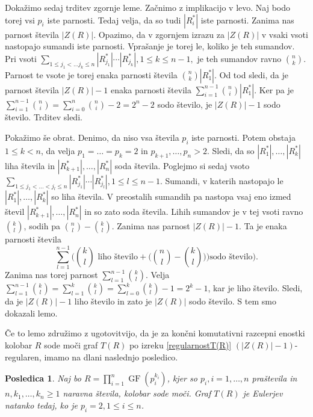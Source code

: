 \documentclass[a4paper, 12pt]{amsart}
\theoremstyle{definition} %
\theoremstyle{plain} %
\newtheorem{posledica}[definicija]{Posledica}
\DeclareMathOperator{\GF}{GF}
\begin{document}
Dokažimo sedaj trditev zgornje leme. Začnimo z implikacijo v levo. Naj bodo torej vsi $p_i$ iste parnosti. Tedaj velja, da so tudi $|R_i^*|$ iste parnosti. Zanima nas parnost števila $|Z(R)|$. Opazimo, da v zgornjem izrazu za $|Z(R)|$ v vsaki vsoti nastopajo sumandi iste parnosti. Vprašanje je torej le, koliko je teh sumandov. Pri vsoti $\sum_{1\le j_1 < \dots j_k \le n}|R_{j_1}^*| \cdots |R_{j_k}^*|, 1 \le k \le n-1,$ je teh sumandov ravno ${n \choose k}$. Parnost te vsote je torej enaka parnosti števila ${n \choose k} |R_1^*|$. Od tod sledi, da je parnost števila $|Z(R)| -1$ enaka parnosti števila $\sum_{i=1}^{n-1} {n \choose i} |R_1^*|$. Ker pa je $\sum_{i=1}^{n-1} {n \choose i} = \sum_{i=0}^{n} {n \choose i} - 2 = 2^n - 2 $ sodo število, je $|Z(R)| -1$ sodo število. Trditev sledi.

Pokažimo še obrat. Denimo, da niso vsa števila $p_i$ iste parnosti. Potem obstaja $1\le k <n$, da velja $p_1 = \dots=p_k =2$ in $p_{k+1},\dots,p_n >2$. Sledi, da so $|R_1^*|,\dots,|R_k^*|$ liha števila in $|R_{k+1}^*|, \dots, |R_n^*|$ soda števila.
Poglejmo si sedaj vsoto  $\sum_{1\le j_1 < \dots < j_l \le n}|R_{j_1}^*| \cdots |R_{j_l}^*|, 1 \le l \le n-1$. Sumandi, v katerih nastopajo le $|R_1^*|,\dots,|R_k^*|$ so liha števila. V preostalih sumandih pa nastopa vsaj eno izmed števil $|R_{k+1}^*|,\dots,|R_n^*|$ in so zato soda števila. Lihih sumandov je v tej vsoti ravno ${k \choose l}$, sodih pa ${n \choose l} - {k \choose l}$. Zanima nas parnost $|Z(R)|-1$. Ta je enaka parnosti števila
$$
\sum_{l=1}^{n-1} \Big( {k \choose l} \text{ liho število} +\big ({n \choose l} - {k \choose l})\big) \text{sodo število}\Big).
$$
Zanima nas torej parnost $\sum_{l=1}^{n-1}  {k \choose l} $. Velja $\sum_{l=1}^{n-1}{ k\choose l} = \sum_{l=1}^k {k \choose l} = \sum_{l=0}^k {k \choose l} - 1 = 2^k -1$, kar je liho število. Sledi, da je $|Z(R)| -1$ liho število in zato je $|Z(R)| $ sodo število. S tem smo dokazali lemo.
\endproof

Če to lemo združimo z ugotovitvijo, da je za končni komutativni razcepni enostki kolobar $R$ sode moči graf $T(R)$ po izreku \ref{regularnostT(R)} $( |Z(R)| -1)$-regularen, imamo na dlani naslednjo posledico.

\begin{posledica}
Naj bo $R=\prod_{i=1}^n \GF(p_i^{k_i})$, kjer so $p_i,i=1,\dots,n$ praštevila in $n, k_1,\dots,k_n\ge 1$ naravna števila, kolobar sode moči. Graf $T(R)$ je Eulerjev natanko tedaj, ko je $p_i=2, 1\le i\le n$. 
\end{posledica}
\end{document}
